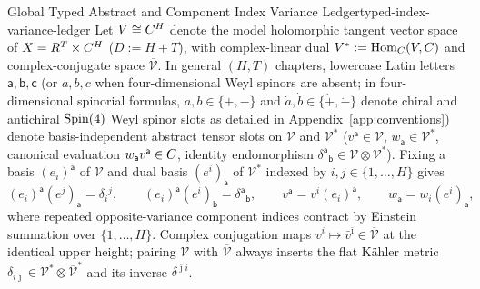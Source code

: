 \begin{zkmodule}{Global Typed Abstract and Component Index Variance Ledger}{typed-index-variance-ledger}
Let $V \cong C^H$ denote the model holomorphic tangent vector space of $X = R^T \times C^H$ ($D := H + T$), with complex-linear dual $V^* := \operatorname{Hom}_{C}(V, C)$ and complex-conjugate space $\overline{\mathcal{V}}$. In general $(H,T)$ chapters, lowercase Latin letters $\mathsf{a},\mathsf{b},\mathsf{c}$ (or $a,b,c$ when four-dimensional Weyl spinors are absent; in four-dimensional spinorial formulas, $a,b \in \{+,-\}$ and $\dot{a},\dot{b} \in \{\dot{+},\dot{-}\}$ denote chiral and antichiral $\operatorname{Spin}(4)$ Weyl spinor slots as detailed in Appendix~\ref{app:conventions}) denote basis-independent abstract tensor slots on $\mathcal{V}$ and $\mathcal{V}^*$ ($v^{\mathsf{a}} \in \mathcal{V}$, $w_{\mathsf{a}} \in \mathcal{V}^*$, canonical evaluation $w_{\mathsf{a}}v^{\mathsf{a}} \in C$, identity endomorphism $\delta^{\mathsf{a}}{}_{\mathsf{b}} \in \mathcal{V}\otimes\mathcal{V}^*$). Fixing a basis $(e_i)^{\mathsf{a}}$ of $\mathcal{V}$ and dual basis $(e^i)_{\mathsf{a}}$ of $\mathcal{V}^*$ indexed by $i,j \in \{1,\dots,H\}$ gives
\begin{equation}
\label{eq:tetrad-bridge}
(e_i)^{\mathsf{a}}(e^j)_{\mathsf{a}} = \delta_i{}^j,\qquad
(e_i)^{\mathsf{a}}(e^i)_{\mathsf{b}} = \delta^{\mathsf{a}}{}_{\mathsf{b}},\qquad
v^{\mathsf{a}} = v^i(e_i)^{\mathsf{a}},\qquad
w_{\mathsf{a}} = w_i(e^i)_{\mathsf{a}},
\end{equation}
where repeated opposite-variance component indices contract by Einstein summation over $\{1,\dots,H\}$. Complex conjugation maps $v^i \mapsto \bar{v}^{\bar{\imath}} \in \overline{\mathcal{V}}$ at the identical upper height; pairing $\mathcal{V}$ with $\overline{\mathcal{V}}$ always inserts the flat K\"ahler metric $\delta_{i\bar{\jmath}} \in \mathcal{V}^*\otimes\overline{\mathcal{V}}^*$ and its inverse $\delta^{\bar{\jmath}i}$.


\end{zkmodule}
